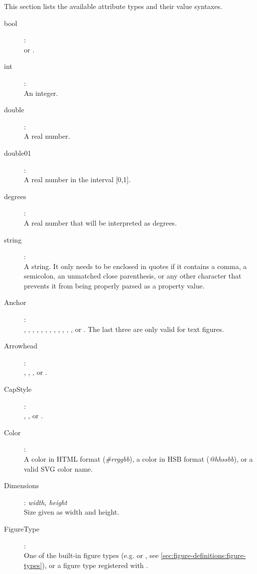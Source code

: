 This section lists the available attribute types and their value syntaxes.

\begin{description}

\item[bool]: \\
 or .

\item[int]: \\
An integer.

\item[double]: \\
A real number.

\item[double01]: \\
A real number in the interval [0,1].

\item[degrees]: \\
A real number that will be interpreted as degrees.

\item[string]: \\
A string. It only needs to be enclosed in quotes if it contains a comma,
a semicolon, an unmatched close parenthesis, or any other character that prevents
it from being properly parsed as a property value.

\item[Anchor]: \\
, , , , , , ,
, , , , , or .
The last three are only valid for text figures.

\item[Arrowhead]: \\
, , , or .

\item[CapStyle]: \\
, , or .

\item[Color]: \\
A color in HTML format (\textit{\#rrggbb}), a color in
HSB format (\textit{@hhssbb}), or a valid SVG color name.

\item[Dimensions]: \textit{width, height} \\
Size given as width and height.

\item[FigureType]: \\
One of the built-in figure types (e.g.  or , see
\ref{sec:figure-definitions:figure-types}), or a figure type registered
with .


\end{description}
